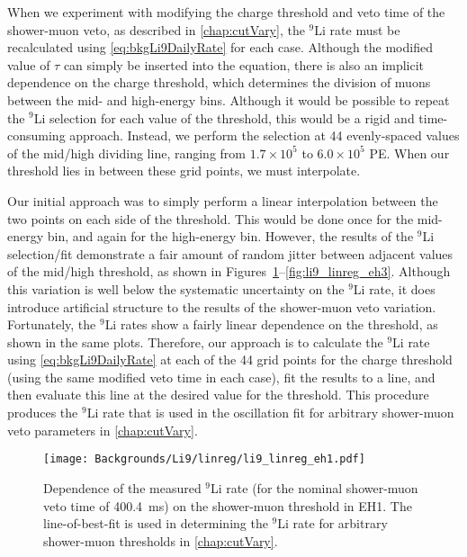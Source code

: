 \documentclass[../thesis.tex]{subfiles}
\begin{document}
When we experiment with modifying the charge threshold and veto time of the shower-muon veto, as described in \autoref{chap:cutVary}, the $^9$Li rate must be recalculated using \autoref{eq:bkgLi9DailyRate} for each case. Although the modified value of $\tau$ can simply be inserted into the equation, there is also an implicit dependence on the charge threshold, which determines the division of muons between the mid- and high-energy bins. Although it would be possible to repeat the $^9$Li selection for each value of the threshold, this would be a rigid and time-consuming approach. Instead, we perform the selection at 44 evenly-spaced values of the mid/high dividing line, ranging from $1.7\times10^5$ to $6.0\times10^5$ PE\@. When our threshold lies in between these grid points, we must interpolate.

Our initial approach was to simply perform a linear interpolation between the two points on each side of the threshold. This would be done once for the mid-energy bin, and again for the high-energy bin. However, the results of the $^9$Li selection/fit demonstrate a fair amount of random jitter between adjacent values of the mid/high threshold, as shown in Figures~\ref{fig:li9_linreg_eh1}--\ref{fig:li9_linreg_eh3}. Although this variation is well below the systematic uncertainty on the $^9$Li rate, it does introduce artificial structure to the results of the shower-muon veto variation. Fortunately, the $^9$Li rates show a fairly linear dependence on the threshold, as shown in the same plots. Therefore, our approach is to calculate the $^9$Li rate using \autoref{eq:bkgLi9DailyRate} at each of the 44 grid points for the charge threshold (using the same modified veto time in each case), fit the results to a line, and then evaluate this line at the desired value for the threshold.
This procedure produces the $^9$Li rate that is used in the oscillation fit for arbitrary shower-muon veto parameters in \autoref{chap:cutVary}.

\begin{figure}[ht]
  \texttt{[image: Backgrounds/Li9/linreg/li9\_linreg\_eh1.pdf]}
  \caption{Dependence of the measured $^9$Li rate (for the nominal shower-muon veto time of 400.4~ms) on the shower-muon threshold in EH1. The line-of-best-fit is used in determining the $^9$Li rate for arbitrary shower-muon thresholds in \autoref{chap:cutVary}.}
  \label{fig:li9_linreg_eh1}
\end{figure}
\end{document}

